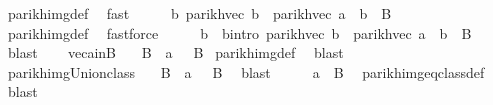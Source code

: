 \begin{isabellebody}
\ parikh{\isacharunderscore}{\kern0pt}img{\isacharunderscore}{\kern0pt}def\ \isamarkupfalse%
\ fast\isanewline
\ \ \isamarkupfalse%
\ \isamarkupfalse%
\ {\isachardoublequoteopen}{\isasymexists}b{\isachardot}{\kern0pt}\ parikh{\isacharunderscore}{\kern0pt}vec\ b\ {\isacharequal}{\kern0pt}\ parikh{\isacharunderscore}{\kern0pt}vec\ a\ {\isasymand}\ b\ {\isasymin}\ {\isacharquery}{\kern0pt}B{\isacharprime}{\kern0pt}{\isachardoublequoteclose}\isanewline
\ \ \ \ \isamarkupfalse%
\ parikh{\isacharunderscore}{\kern0pt}img{\isacharunderscore}{\kern0pt}def\ \isamarkupfalse%
\ fastforce\isanewline
\ \ \isamarkupfalse%
\ \isamarkupfalse%
\ b\ \ b{\isacharunderscore}{\kern0pt}intro{\isacharcolon}{\kern0pt}\ {\isachardoublequoteopen}parikh{\isacharunderscore}{\kern0pt}vec\ b\ {\isacharequal}{\kern0pt}\ parikh{\isacharunderscore}{\kern0pt}vec\ a\ {\isasymand}\ b\ {\isasymin}\ {\isacharquery}{\kern0pt}B{\isacharprime}{\kern0pt}{\isachardoublequoteclose}\ \isamarkupfalse%
\ blast\isanewline
\ \ \isamarkupfalse%
\ vec{\isacharunderscore}{\kern0pt}a{\isacharunderscore}{\kern0pt}in{\isacharunderscore}{\kern0pt}B{\isacharprime}{\kern0pt}\ \isamarkupfalse%
\ {\isachardoublequoteopen}{\isasymPsi}\ {\isacharparenleft}{\kern0pt}{\isacharquery}{\kern0pt}B{\isacharprime}{\kern0pt}\ {\isasymunion}\ {\isacharbraceleft}{\kern0pt}a{\isacharbraceright}{\kern0pt}{\isacharparenright}{\kern0pt}\ {\isacharequal}{\kern0pt}\ {\isasymPsi}\ {\isacharquery}{\kern0pt}B{\isacharprime}{\kern0pt}{\isachardoublequoteclose}\isamarkupfalse%
\ parikh{\isacharunderscore}{\kern0pt}img{\isacharunderscore}{\kern0pt}def\ \isamarkupfalse%
\ blast\isanewline
\ \ \isamarkupfalse%
\ parikh{\isacharunderscore}{\kern0pt}img{\isacharunderscore}{\kern0pt}Union{\isacharunderscore}{\kern0pt}class\ \isamarkupfalse%
\ {\isachardoublequoteopen}{\isasymPsi}\ {\isacharparenleft}{\kern0pt}{\isacharquery}{\kern0pt}B{\isacharprime}{\kern0pt}\ {\isasymunion}\ {\isacharbraceleft}{\kern0pt}a{\isacharbraceright}{\kern0pt}{\isacharparenright}{\kern0pt}\ {\isacharequal}{\kern0pt}\ {\isasymPsi}\ B{\isachardoublequoteclose}\ \isamarkupfalse%
\ blast\isanewline
\ \ \isamarkupfalse%
\ \isamarkupfalse%
\ {\isachardoublequoteopen}a\ {\isasymin}\ {\isacharquery}{\kern0pt}B{\isacharprime}{\kern0pt}{\isachardoublequoteclose}\ \isamarkupfalse%
\ parikh{\isacharunderscore}{\kern0pt}img{\isacharunderscore}{\kern0pt}eq{\isacharunderscore}{\kern0pt}class{\isacharunderscore}{\kern0pt}def\ \isamarkupfalse%
\ blast\isanewline
{}\isamarkupfalse%
%
\endisatagproof
{\isafoldproof}%
%
\isadelimproof
\isanewline
%
\endisadelimproof
%
\isadelimtheory
\isanewline
%
\endisadelimtheory
%
\isatagtheory
{}\isamarkupfalse%
%
\endisatagtheory
{\isafoldtheory}%
%
\isadelimtheory
%
\endisadelimtheory
%
\end{isabellebody}%
